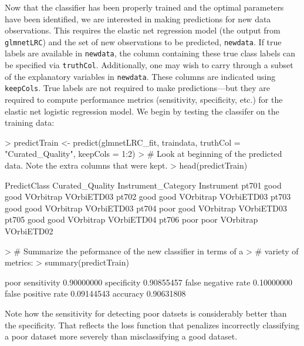 \documentclass{article}
\begin{document}
Now that the classifier has been properly trained and the optimal parameters have been identified, we are interested in making predictions for new data observations. This requires the elastic net regression model (the output from {\tt glmnetLRC}) and the set of new observations to be predicted, {\tt newdata}.  If true labels are available in {\tt newdata}, the column containing these true class labels can be specified via {\tt truthCol}. Additionally, one may wish to carry through a subset of the explanatory variables in {\tt newdata}.  These columns are indicated using {\tt keepCols}.   True labels are not required to make predictions---but they are required to compute performance metrics (sensitivity, specificity, etc.) for the elastic net logistic regression model. We begin by testing the classifer on the training data:
\begin{Schunk}
\begin{Sinput}
> predictTrain <- predict(glmnetLRC_fit, traindata, truthCol = "Curated_Quality", keepCols = 1:2)
> # Look at beginning of the predicted data.  Note the extra columns that were kept.
> head(predictTrain)
\end{Sinput}
\begin{Soutput}
      PredictClass Curated_Quality Instrument_Category Instrument
pt701         good            good           VOrbitrap VOrbiETD03
pt702         good            good           VOrbitrap VOrbiETD03
pt703         good            good           VOrbitrap VOrbiETD03
pt704         poor            good           VOrbitrap VOrbiETD03
pt705         good            good           VOrbitrap VOrbiETD04
pt706         poor            poor           VOrbitrap VOrbiETD02
\end{Soutput}
\begin{Sinput}
> # Summarize the peformance of the new classifier in terms of a 
> # variety of metrics:
> summary(predictTrain)
\end{Sinput}
\begin{Soutput}
                          poor
sensitivity         0.90000000
specificity         0.90855457
false negative rate 0.10000000
false positive rate 0.09144543
accuracy            0.90631808
\end{Soutput}
\end{Schunk}
\noindent Note how the sensitivity for detecting poor datsets is considerably better than the specificity.  That reflects the loss function that penalizes incorrectly classifying a poor dataset more severely than misclassifying a good dataset.
\end{document}
